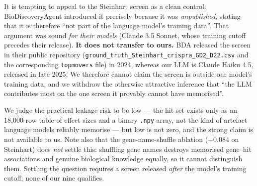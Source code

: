 \documentclass[11pt]{article}
\begin{document}
It is tempting to appeal to the Steinhart screen as a clean control: BioDiscoveryAgent introduced it
precisely because it was \emph{unpublished}, stating that it is therefore ``not part of the language
model's training data''. That argument was sound \emph{for their models} (Claude 3.5 Sonnet, whose
training cutoff precedes their release). \textbf{It does not transfer to ours.} BDA released the
screen in their public repository (\texttt{ground\_truth\_Steinhart\_crispra\_GD2\_D22.csv} and the
corresponding \texttt{topmovers} file) in 2024, whereas our LLM is Claude Haiku 4.5, released in late
2025. We therefore cannot claim the screen is outside our model's training data, and we withdraw the
otherwise attractive inference that ``the LLM contributes most on the one screen it provably cannot
have memorised''.

We judge the practical leakage risk to be low --- the hit set exists only as an 18{,}000-row table of
effect sizes and a binary \texttt{.npy} array, not the kind of artefact language models reliably
memorise --- but low is not zero, and the strong claim is not available to us.
Note also that the gene-name-shuffle ablation ($-0.084$ on Steinhart) does \emph{not} settle this:
shuffling gene names destroys memorised gene--hit associations and genuine biological knowledge
equally, so it cannot distinguish them.
Settling the question requires a screen released \emph{after} the model's training cutoff; none of our
nine qualifies.
\end{document}
